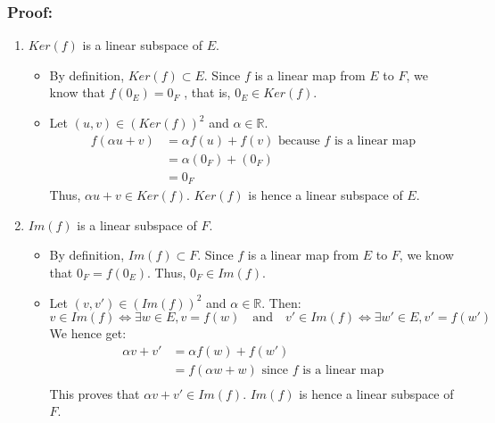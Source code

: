 \documentclass[notitlepage]{math}
\begin{document}
\subsubsection{Proof:}
\begin{enumerate}
    \item $Ker(f)$ is a linear subspace of $E$.
    \begin{itemize}
        \item By definition, $Ker(f) \subset E$. Since $f$ is a linear map from $E$ to $F$, we know that $f(0_E) = 0_F$ , that is, $0_E \in Ker(f)$.
        \item Let $(u, v) \in (Ker(f))^2$ and $\alpha \in \mathbb{R}$.
        \begin{align*}
            f(\alpha u + v) &= \alpha f(u) + f(v) \text{ because } f \text{ is a linear map} \\
            &= \alpha (0_F) + (0_F) \\
            &= 0_F
        \end{align*}
        Thus, $\alpha u + v \in Ker(f)$. $Ker(f)$ is hence a linear subspace of $E$.
    \end{itemize}
    \item $Im(f)$ is a linear subspace of $F$.
    \begin{itemize}
        \item By definition, $Im(f) \subset F$. Since $f$ is a linear map from $E$ to $F$, we know that $0_F = f(0_E)$. Thus, $0_F \in Im(f)$.
        \item Let $(v, v') \in (Im(f))^2$ and $\alpha \in \mathbb{R}$. Then:
        \[v \in Im(f) \Leftrightarrow \exists w \in E, v = f(w) \quad \text{and} \quad v' \in Im(f) \Leftrightarrow \exists w' \in E, v' = f(w')\]
        We hence get:
        \begin{align*}
            \alpha v + v' &= \alpha f(w) + f(w') \\
            &= f(\alpha w + w) \text{ since } f \text{ is a linear map}\\
        \end{align*}
        This proves that $\alpha v + v' \in Im(f)$. $Im(f)$ is hence a linear subspace of $F$.
    \end{itemize}
\end{enumerate}
\end{document}
